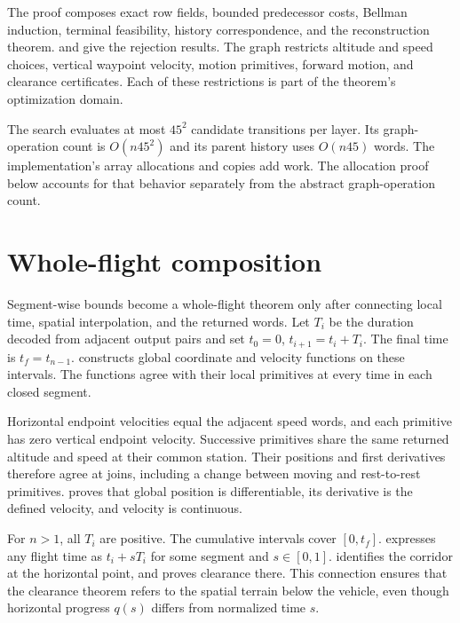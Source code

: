 \documentclass[11pt]{article}
\begin{document}
The proof composes exact row fields, bounded predecessor costs, Bellman induction, terminal feasibility, history correspondence, and the reconstruction theorem.   and  give the rejection results.  The graph restricts altitude and speed choices, vertical waypoint velocity, motion primitives, forward motion, and clearance certificates.  Each of these restrictions is part of the theorem's optimization domain.

The search evaluates at most $45^2$ candidate transitions per layer.  Its graph-operation count is $O(n45^2)$ and its parent history uses $O(n45)$ words.  The implementation's array allocations and copies add work.  The allocation proof below accounts for that behavior separately from the abstract graph-operation count.

\section{Whole-flight composition}
\label{sec:flight}

Segment-wise bounds become a whole-flight theorem only after connecting local time, spatial interpolation, and the returned words.  Let $T_i$ be the duration decoded from adjacent output pairs and set $t_0=0$, $t_{i+1}=t_i+T_i$.  The final time is $t_f=t_{n-1}$.   constructs global coordinate and velocity functions on these intervals.  The functions agree with their local primitives at every time in each closed segment.

Horizontal endpoint velocities equal the adjacent speed words, and each primitive has zero vertical endpoint velocity.  Successive primitives share the same returned altitude and speed at their common station.  Their positions and first derivatives therefore agree at joins, including a change between moving and rest-to-rest primitives.   proves that global position is differentiable, its derivative is the defined velocity, and velocity is continuous.

For $n>1$, all $T_i$ are positive.  The cumulative intervals cover $[0,t_f]$.   expresses any flight time as $t_i+sT_i$ for some segment and $s\in[0,1]$.   identifies the corridor at the horizontal point, and  proves clearance there.  This connection ensures that the clearance theorem refers to the spatial terrain below the vehicle, even though horizontal progress $q(s)$ differs from normalized time $s$.
\end{document}
